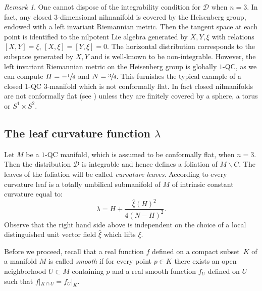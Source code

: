 \documentclass[JEP,XML,SOM,Unicode]{cedram}
\let\mathcal\mathscr
\let\moins\smallsetminus
\theoremstyle{definition}
\theoremstyle{remark}
\newtheorem{remark}[theorem]{Remark}
\numberwithin{equation}{section}
\begin{document}
\begin{remark}
One cannot dispose of the integrability condition for $\mathcal D$ when $n=3$.
In fact, any closed $3$\nobreakdash-dimensional nilmanifold
is covered by the Heisenberg group, endowed with a
left invariant Riemannian metric. Then
the tangent space at each point is identified to the
nilpotent Lie algebra generated by $X,Y,\xi$ with relations
$[X,Y]=\xi$, $[X,\xi]=[Y,\xi]=0$. The
horizontal distribution corresponds to the subspace
generated by $X,Y$ and is well-known to be non-integrable.
However, the left invariant Riemannian metric on the Heisenberg
group is globally $1$-QC, as we can compute
$H=\nobreak-\sfrac{1}{4}$ and $N=\sfrac{3}{4}$. This furnishes the
typical example of a closed $1$-QC $3$\nobreakdash-manifold which is not conformally flat.
In fact closed nilmanifolds are not conformally flat
(see \cite{Go}) unless they are finitely
covered by a sphere, a torus or $S^1\times S^2$.
\end{remark}

\subsection{The leaf curvature function $\lambda$}\label{leafcurv}
Let $M$ be a $1$-QC manifold, which is assumed to be conformally flat, when $n=3$.
Then the distribution $\mathcal D$ is integrable and hence defines a foliation of $M\moins C$. The leaves
of the foliation will be called \emph{curvature leaves}.
According to \cite{BP,GM} every curvature leaf is a totally umbilical submanifold
of $M$ of intrinsic constant curvature equal to:
\[\lambda=H + \frac{\widehat{\xi}(H)^2}{4(N-H)^2}.\]
Observe that the right hand side above is independent on the choice of a local distinguished unit vector field
$\widehat{\xi}$ which lifts $\xi$.

Before we proceed, recall that a real function $f$ defined on a compact subset~$K$ of a manifold $M$ is
called \emph{smooth} if for every point $p\in K$ there exists an open neighborhood $U\subset M$ containing $p$
and a real smooth function $f_U$ defined on $U$ such that $f|_{K\cap U}=f_U|_K$.
\end{document}
